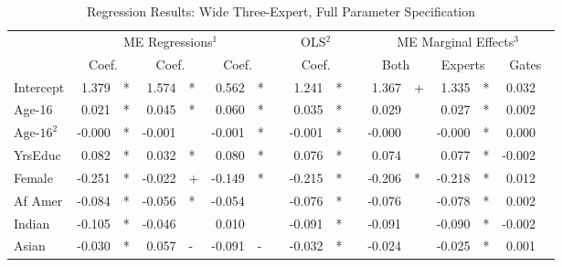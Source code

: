 \documentclass[12pt]{article}
\theoremstyle{definition}
\begin{document}
  
  \begin{landscape}
  \begin{table} \centering
    \caption{Regression Results: Wide Three-Expert, Full Parameter Specification}
      \begin{threeparttable}
        \begin{tabular}[l]{l r l r l r l c r l c r l r l r l}
  
  \cmidrule{1-17}
  & \multicolumn{6}{c}{ME Regressions$^{1}$} &&  \multicolumn{2}{c}{OLS$^{2}$} && \multicolumn{6}{c}{ME Marginal Effects$^{3}$} \\
  \cmidrule(l){2-7}    \cmidrule(l){9-10}     \cmidrule(l){12-17}
  & \multicolumn{2}{c}{Coef.} &  \multicolumn{2}{c}{Coef.} &  \multicolumn{2}{c}{Coef.}  && \multicolumn{2}{c}{Coef.} && \multicolumn{2}{c}{Both}    &  \multicolumn{2}{c}{Experts}  &  \multicolumn{2}{c}{Gates} \\
                  \cmidrule(l){2-3} \cmidrule(l){4-5} \cmidrule(l){6-7} \cmidrule(l){9-10} \cmidrule(l){12-13} \cmidrule(l){14-15} \cmidrule(l){16-17}
  Intercept             &  1.379 & *      &  1.574 & *      &  0.562 & *      &&  1.241 & *     &&  1.367 & +        &  1.335 & *        &  0.032 &        \\
  Age-16                &  0.021 & *      &  0.045 & *      &  0.060 & *      &&  0.035 & *     &&  0.029 &          &  0.027 & *        &  0.002 &        \\
  $\textrm{Age-16}^{2}$ & -0.000 & *      & -0.001 &        & -0.001 & *      && -0.001 & *     && -0.000 &          & -0.000 & *        &  0.000 &        \\
  YrsEduc               &  0.082 & *      &  0.032 & *      &  0.080 & *      &&  0.076 & *     &&  0.074 &          &  0.077 & *        & -0.002 &        \\
  Female                & -0.251 & *      & -0.022 & +      & -0.149 & *      && -0.215 & *     && -0.206 & *        & -0.218 & *        &  0.012 &        \\
  Af Amer               & -0.084 & *      & -0.056 & *      & -0.054 &        && -0.076 & *     && -0.076 &          & -0.078 & *        &  0.002 &        \\
  Indian                & -0.105 & *      & -0.046 &        &  0.010 &        && -0.091 & *     && -0.091 &          & -0.090 & *        & -0.002 &        \\
  Asian                 & -0.030 & *      &  0.057 & -      & -0.091 & -      && -0.032 & *     && -0.024 &          & -0.025 & *        &  0.001 &        \\

\end{tabular}
\end{threeparttable}
\end{table}
\end{landscape}
\end{document}
